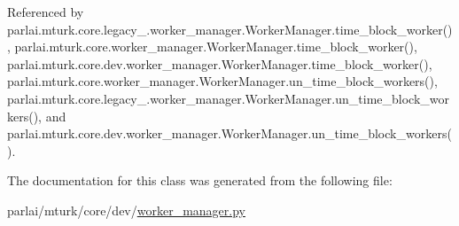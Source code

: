 Referenced by parlai.\+mturk.\+core.\+legacy\+\_.\+worker\+\_\+manager.\+Worker\+Manager.\+time\+\_\+block\+\_\+worker(), parlai.\+mturk.\+core.\+worker\+\_\+manager.\+Worker\+Manager.\+time\+\_\+block\+\_\+worker(), parlai.\+mturk.\+core.\+dev.\+worker\+\_\+manager.\+Worker\+Manager.\+time\+\_\+block\+\_\+worker(), parlai.\+mturk.\+core.\+worker\+\_\+manager.\+Worker\+Manager.\+un\+\_\+time\+\_\+block\+\_\+workers(), parlai.\+mturk.\+core.\+legacy\+\_.\+worker\+\_\+manager.\+Worker\+Manager.\+un\+\_\+time\+\_\+block\+\_\+workers(), and parlai.\+mturk.\+core.\+dev.\+worker\+\_\+manager.\+Worker\+Manager.\+un\+\_\+time\+\_\+block\+\_\+workers().



The documentation for this class was generated from the following file\+:\begin{DoxyCompactItemize}
\item 
parlai/mturk/core/dev/\hyperlink{dev_2worker__manager_8py}{worker\+\_\+manager.\+py}\end{DoxyCompactItemize}

